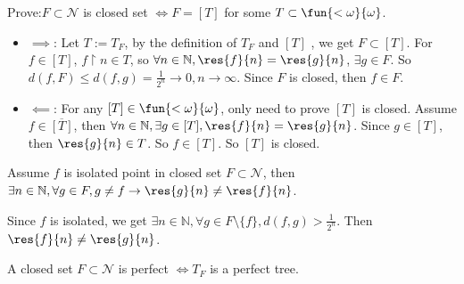 \documentclass{ctexart}
\newif\ifpreface
\begin{document}
\large
\setlength{\baselineskip}{1.2em}
\ifpreface
    
\else
\maketitle
\fi
{}
\begin{problem}
  Prove:\(F \subset \mathcal{N}\) is closed set \(\iff F = [T]\) for some \(T \subset \fun{<\omega}{\omega}\). 
\end{problem}
\begin{solution}
  \begin{itemize}
    \item \(\implies\): Let \(T:=T_F\), by the definition of \(T_F\) and \([T]\) ,
      we get \(F \subset [T]\). 
      For \(f \in [T]\), \(f\upharpoonright n \in T\), so 
      \(\forall n \in \mathbb{N}, \res{f}{n}=\res{g}{n}\), \(\exists  g \in F\). 
      So \(d(f,F) \leq d(f,g)=\frac{1}{2^{n}}\to 0, n \to \infty\). 
      Since \(F\) is closed, then \(f \in F\). 

    \item \(\impliedby\): For any \([T] \in \fun{<\omega}{\omega}\), only need to prove \([T]\) is closed. 
      Assume \(f \in \overline{[T]}\), then \(\forall n \in \mathbb{N},\exists g \in [T],\res{f}{n}=\res{g}{n}\). 
      Since \(g \in [T]\), then \(\res{g}{n} \in T\). So \(f \in [ T]\). 
      So \([T]\) is closed. 
  \end{itemize}
\end{solution}

\begin{problem}\label{pro:3}
  Assume \(f\) is isolated point in closed set \(F \subset \mathcal{N}\), then 
  \(\exists n \in \mathbb{N},\forall g \in F,g \neq f \to \res{g}{n} \neq \res{f}{n}\). 
\end{problem}

\begin{solution}
  Since \(f\) is isolated, we get \(\exists n \in \mathbb{N},\forall g \in F \setminus \{f\},d(f,g)>\frac{1}{2^n}\). 
  Then \(\res{f}{n} \neq \res{g}{n}\). 
\end{solution}

\begin{problem}
  A closed set \(F \subset \mathcal{N}\) is perfect \(\iff T_F\) is a perfect tree. 
\end{problem}
\end{document}
